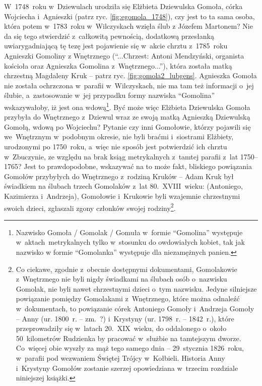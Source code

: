 W~1748~roku w~Dziewulach urodziła się Elżbieta Dziewulska Gomoła, 
córka Wojciecha i~Agnieszki (patrz ryc. \ref{fig:egomola_1748}), czy jest to 
ta sama osoba, która potem w~1783~roku w~Wilczyskach wzięła ślub z Józefem 
Martonem? Nie da się tego stwierdzić z~całkowitą pewnością, dodatkową 
przesłanką uwiarygadniającą tę tezę jest pojawienie się w~akcie chrztu 
z~1785~roku Agnieszki Gomoliny z Wnętrznego (\enquote{...Chrzest: Antoni 
Mendzyński, organista kościoła oraz Agnieszka Gomolina z~Wnętrznego...}), 
która została matką chrzestną Magdaleny Kruk -- patrz ryc. 
\ref{fig:gomola2_lubgens}. Agnieszka Gomoła nie została ochrzczona w~parafii 
w~Wilczyskach, nie ma tam też informacji o~jej ślubie, a~zastosowanie w~jej 
przypadku formy nazwiska \enquote{Gomolina} wskazywałoby, iż jest ona 
wdową\footnote{Nazwisko Gomoła / Gomolak / Gomuła w~formie \enquote{Gomolina}
występuje w~aktach~metrykalnych tylko w~stosunku do owdowiałych kobiet, tak 
jak nazwisko w formie \enquote{Gomolanka} występuje dla niezamężnych 
panien.}. Być może więc Elżbieta Dziewulska Gomoła przybyła do Wnętrznego 
z~Dziewul wraz ze swoją matką Agnieszką Dziewulską Gomołą, wdową po 
Wojciechu? Pytanie czy inni Gomołowie, którzy pojawili się we~Wnętrznym 
w~podobnym okresie, nie byli braćmi i~siostrami Elżbiety, urodzonymi po 
1750~roku, a~więc nie sposób jest potwierdzić ich chrztu w~Zbuczynie, ze 
względu na brak ksiąg metrykalnych z~tamtej parafii z~lat 1750--1765? Jest to 
prawdopodobne, wskazywać na to może fakt, bliskiego powiązania Gomołów 
przybyłych do Wnętrznego z~rodziną Kruków -- Adam Kruk był świadkiem na 
ślubach trzech Gomolaków z~lat 80.~XVIII~wieku: (Antoniego, Kazimierza 
i~Andrzeja), Gomołowie i~Krukowie byli wzajemnie chrzestnymi swoich dzieci, 
zgłaszali zgony członków swojej rodziny\footnote{Co ciekawe, zgodnie 
z~obecnie dostępnymi dokumentami, Gomolakowie z~Wnętrznego nie byli nigdy 
świadkami na ślubach osób o~nazwisku Gomolak, nie byli nawet chrzestnymi 
dzieci o~tym nazwisku. Jedyne silniejsze powiązanie pomiędzy Gomolakami 
z~Wnętrznego, które można odnaleźć w~dokumentach, to powiązanie córek 
Antoniego Gomoły i~Andrzeja Gomoły -- Anny (ur. 1800~r. -- zm.~?) i~Krystyny 
(ur. 1798~r. -- 1842~r.), które przeprowadziły się w~latach 20.~XIX~wieku, do 
oddalonego o~około 50~kilometrów Rudzienka by pracować w~służbie na 
tamtejszym dworze. Co~więcej obie wyszły za mąż tego samego dnia -- 
29~stycznia 1826~roku, w~parafii pod wezwaniem Świętej Trójcy w~Kołbieli. 
Historia Anny i~Krystyny Gomołów zostanie szerzej opowiedziana w~trzecim 
rozdziale niniejszej książki.}.

